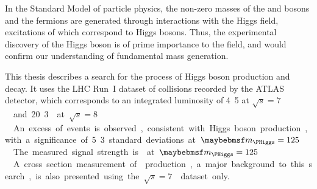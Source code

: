 
In the Standard Model of particle physics, the non-zero masses of the \PW and \PZ bosons and 
the fermions are generated through interactions with the Higgs field, excitations of which 
correspond to Higgs bosons. Thus, the experimental discovery of the Higgs boson is of prime 
importance to the field, and would confirm our understanding of fundamental mass generation.

This thesis describes a search for the \ggHWWlvlv process of Higgs boson production and decay.
It uses the LHC Run~I dataset of \pp collisions recorded by the ATLAS detector, which 
corresponds to an integrated luminosity of \unit{4.5}{\invfb} at \unit{$\sqrt{s} = 7$}{\TeV} 
and \unit{20.3}{\invfb} at \unit{$\sqrt{s} = 8$}{\TeV}. An excess of events is observed, 
consistent with Higgs boson production, with a significance of 5.3 standard deviations at 
\unit{$\mH = 125$}{\GeV}. The measured signal strength is  at 
\unit{$\mH = 125$}{\GeV}. A cross section measurement of \WW production, a major background 
to this search, is also presented using the \unit{$\sqrt{s} = 7$}{\TeV} dataset only.
